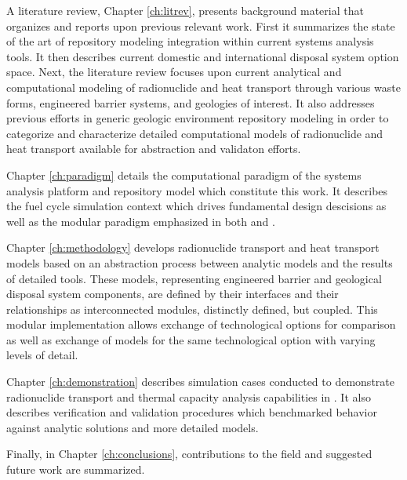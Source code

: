 
A literature review, Chapter \ref{ch:litrev}, presents background material that organizes and 
reports upon previous relevant work. First it summarizes the state of the art of 
repository modeling integration within current systems analysis tools. It then 
describes current domestic and international disposal system option space. 
Next, the literature review focuses upon current analytical and 
computational modeling of radionuclide and heat transport through various waste 
forms, engineered barrier systems, and geologies of interest.  It also 
addresses previous efforts in generic geologic environment repository modeling in order to 
categorize and characterize detailed computational models of radionuclide and 
heat transport available for abstraction and validaton efforts.


Chapter \ref{ch:paradigm} details the computational paradigm of the \Cyclus 
systems analysis platform and \Cyder repository model which constitute this work. 
It describes the \Cyclus fuel cycle simulation context which drives fundamental 
\Cyder design descisions as well as the modular paradigm emphasized in both 
\Cyclus and \Cyder. 


Chapter \ref{ch:methodology} develops  radionuclide transport and heat transport 
models based on an abstraction process between analytic models and the results 
of detailed tools.  These models, representing engineered barrier and geological 
disposal system components, are defined by their interfaces and their 
relationships as interconnected modules, distinctly defined, but coupled.  This 
modular implementation allows exchange  of technological options for comparison 
as well as exchange of models for the same technological option with varying 
levels of detail.  


Chapter \ref{ch:demonstration} describes simulation cases conducted to 
demonstrate radionuclide transport and thermal capacity analysis capabilities in \Cyder. It 
also describes verification and validation procedures which benchmarked \Cyder 
behavior against analytic solutions and more detailed models.


Finally, in Chapter \ref{ch:conclusions}, contributions to the field and 
suggested future work are summarized. 



